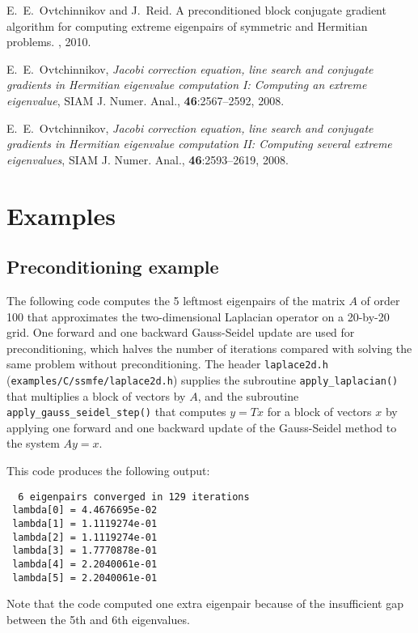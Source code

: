 E.~E.~Ovtchinnikov and J.~Reid.
A preconditioned block conjugate gradient
algorithm for computing extreme eigenpairs
of symmetric and Hermitian problems.
\report, 2010.

E.~E.~Ovtchinnikov,
{\em Jacobi correction equation, line search and
conjugate gradients in Hermitian eigenvalue computation I:
Computing an extreme eigenvalue},
SIAM J. Numer. Anal., {\bf 46}:2567--2592, 2008.

E.~E.~Ovtchinnikov,
{\em Jacobi correction equation, line search and
conjugate gradients in Hermitian eigenvalue computation II:
Computing several extreme eigenvalues},
SIAM J. Numer. Anal., {\bf 46}:2593--2619, 2008.

\section{Examples}

\subsection{Preconditioning example}
\label{sec:ex.prec}

The following code 
computes the 5 leftmost eigenpairs of 
the matrix $A$ of order 100 that approximates 
the two-dimensional Laplacian operator
on a 20-by-20 grid.
One forward and one backward Gauss-Seidel update
are used for preconditioning,
which halves the number of iterations
compared with solving the same problem without preconditioning.
The header {\tt laplace2d.h} (\texttt{examples/C/ssmfe/laplace2d.h})
supplies the subroutine {\tt apply\_laplacian()}
that multiplies a block of vectors by $A$,
and the subroutine 
{\tt apply\_gauss\_seidel\_step()}
that computes $y = T x$ for a block of vectors $x$
by applying one forward and one backward update
of the Gauss-Seidel method to the system $A y = x$.

This code produces the following output:
\begin{verbatim}
  6 eigenpairs converged in 129 iterations
 lambda[0] = 4.4676695e-02
 lambda[1] = 1.1119274e-01
 lambda[2] = 1.1119274e-01
 lambda[3] = 1.7770878e-01
 lambda[4] = 2.2040061e-01
 lambda[5] = 2.2040061e-01
\end{verbatim}

Note that the code computed one extra eigenpair
because of the insufficient gap between the 5th and 6th
eigenvalues.
